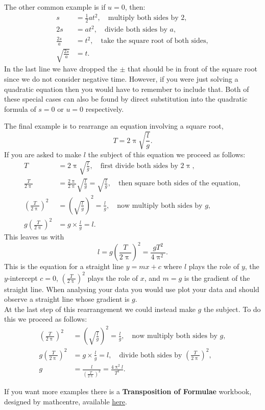 The other common example is if $u=0$, then:
\begin{align*}
s&=\frac{1}{2}at^{2}, \quad \text{multiply both sides by $2$},\\
2s&=at^{2}, \quad \text{divide both sides by $a$},\\
\frac{2s}{a}&=t^{2}, \quad \text{take the square root of both sides},\\
\sqrt{\frac{2s}{a}}&=t.
\end{align*}
In the last line we have dropped the $\pm$ that should be in front of the square root since we do not consider negative time. However, if you were just solving a quadratic equation then you would have to remember to include that.  Both of these special cases can also be found by direct substitution into the quadratic formula of $s=0$ or $u=0$ respectively.\\

\begin{ex}
The final example is to rearrange an equation involving a square root,
\begin{equation*}
T=2\uppi\sqrt{\frac{l}{g}}.
\end{equation*}
If you are asked to make $l$ the subject of this equation we proceed as follows:
\begin{align*}
T&=2\uppi\sqrt{\frac{l}{g}}, \quad \text{first divide both sides by $2\uppi$},\\
\frac{T}{2\uppi}&=\frac{2\uppi}{2\uppi}\sqrt{\frac{l}{g}}=\sqrt{\frac{l}{g}}, \quad \text{then square both sides of the equation},\\
\left(\frac{T}{2\uppi}\right)^{2}&=\left(\sqrt{\frac{l}{g}}\right)^{2}=\frac{l}{g}, \quad \text{now multiply both sides by $g$},\\
g\left(\frac{T}{2\uppi}\right)^{2}&=g\times\frac{l}{g}=l.
\end{align*}
This leaves us with
\begin{equation*}
l=g\left(\frac{T}{2\uppi}\right)^{2}=\frac{gT^{2}}{4\uppi^{2}}.
\end{equation*}
This is the equation for a straight line $y=mx+c$ where $l$ plays the role of $y$, the $y$-intercept $c=0$, $\left(\frac{T}{2\uppi}\right)^{2}$ plays the role of $x$, and $m=g$ is the gradient of the straight line. When analysing your data you would use plot your data and should observe a straight line whose gradient is $g$.\\

At the last step of this rearrangement we could instead make $g$ the subject. To do this we proceed as follows:
\begin{align*}
\left(\frac{T}{2\uppi}\right)^{2}&=\left(\sqrt{\frac{l}{g}}\right)^{2}=\frac{l}{g}, \quad \text{now multiply both sides by $g$},\\
g\left(\frac{T}{2\uppi}\right)^{2}&=g\times \frac{l}{g}=l, \quad \text{divide both sides by }\left(\frac{T}{2\uppi}\right)^{2}, \\
g&=\frac{l}{\left(\frac{T}{2\uppi}\right)^{2}}=\frac{4\uppi^{2} l}{T^{2}}.
\end{align*}
\end{ex}

If you want more examples there is a \textbf{Transposition of Formulae} workbook, designed by mathcentre,  available \href{https://www.mathcentre.ac.uk/resources/uploaded/mc-ty-transposition-2009-1.pdf}{here}.
